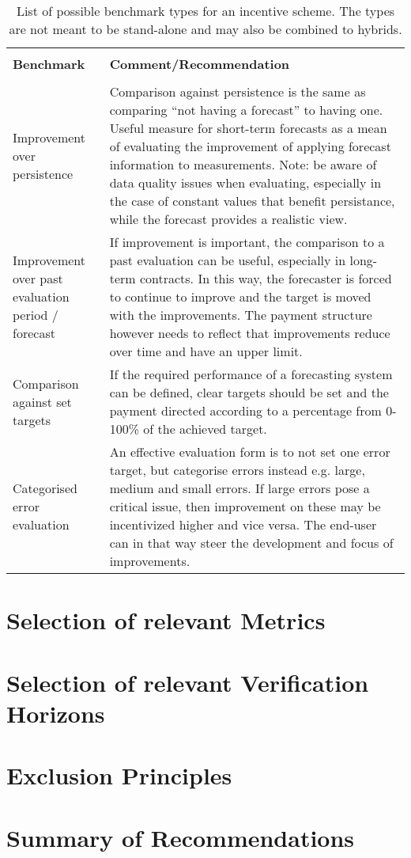 \begin{table}[h!]
 \caption{List of possible benchmark types for an incentive scheme. The types are not meant to be stand-alone and may also be combined to hybrids.}
  \label{table:incentive}
\centering
 \begin{tabular}{ |m{8em}||m{10cm}|  }
 \hline
 & \\
 \textbf{Benchmark} & \textbf{Comment/Recommendation} \\
 & \\
 \hline\hline
Improvement over persistence & Comparison against persistence is the same as comparing “not having a forecast” to having one. Useful measure for short-term forecasts as a mean of evaluating the improvement of applying forecast information to measurements. 
Note: be aware of data quality issues when evaluating, especially in the case of constant values that benefit persistance, while the forecast provides a realistic view.\\
\hline
Improvement over past evaluation period / forecast & If improvement is important, the comparison to a past evaluation can be useful, especially in long-term contracts. In this way, the forecaster is forced to continue to improve and the target is moved with the improvements. The payment structure however needs to reflect that improvements reduce over time and have an upper limit. \\
\hline
Comparison against set targets & If the required performance of a forecasting system can be defined, clear targets should be set and the payment directed according to a percentage from 0-100\% of the achieved target.  \\
\hline
Categorised error evaluation & An effective evaluation form is to not set one error target, but categorise errors instead e.g. large, medium and small errors. If large errors pose a critical issue, then improvement on these may be incentivized higher and vice versa. 
The end-user can in that way steer the development and focus of improvements. \\
 \hline
 \end{tabular}
\end{table}


\section{Selection of relevant Metrics}



\section{Selection of relevant Verification Horizons}


\section{Exclusion Principles}


\section{Summary of Recommendations} 
